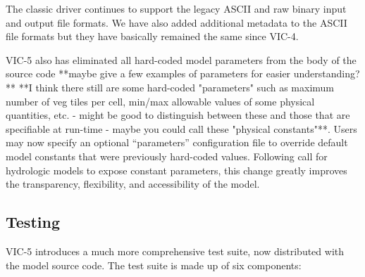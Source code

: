 \documentclass[gmd, manuscript]{copernicus}
\begin{document}
    The classic driver continues to support the legacy ASCII and raw binary input and output file formats. We have also added additional metadata to the ASCII file formats but they have basically remained the same since VIC-4.

    VIC-5 also has eliminated all hard-coded model parameters from the body of the source code **maybe give a few examples of parameters for easier understanding?** **I think there still are some hard-coded "parameters" such as maximum number of veg tiles per cell, min/max allowable values of some physical quantities, etc. - might be good to distinguish between these and those that are specifiable at run-time - maybe you could call these "physical constants"**. Users may now specify an optional ``parameters'' configuration file to override default model constants that were previously hard-coded values. Following \citet{Mendoza_2015} call for hydrologic models to expose constant parameters, this change greatly improves the transparency, flexibility, and accessibility of the model.

  \subsection{Testing}
    \label{sec:testing}
    VIC-5 introduces a much more comprehensive test suite, now distributed with the model source code. The test suite is made up of six components:
\end{document}
